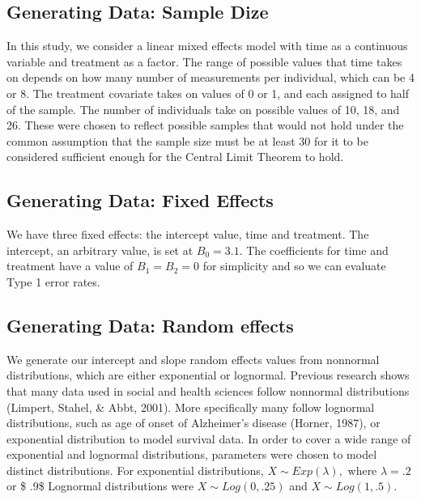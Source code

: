 \documentclass[12pt, twoside]{amherstthesis}
\begin{document}
\hypertarget{generating-data-sample-dize}{%
\subsection{Generating Data: Sample Dize}\label{generating-data-sample-dize}}

In this study, we consider a linear mixed effects model with time as a continuous variable and treatment as a factor. The range of possible values that time takes on depends on how many number of measurements per individual, which can be 4 or 8. The treatment covariate takes on values of 0 or 1, and each assigned to half of the sample. The number of individuals take on possible values of 10, 18, and 26. These were chosen to reflect possible samples that would not hold under the common assumption that the sample size must be at least 30 for it to be considered sufficient enough for the Central Limit Theorem to hold.

\hypertarget{generating-data-fixed-effects}{%
\subsection{Generating Data: Fixed Effects}\label{generating-data-fixed-effects}}

We have three fixed effects: the intercept value, time and treatment. The intercept, an arbitrary value, is set at \(B_0 = 3.1\). The coefficients for time and treatment have a value of \(B_1 = B_2 = 0\) for simplicity and so we can evaluate Type 1 error rates.

\hypertarget{generating-data-random-effects}{%
\subsection{Generating Data: Random effects}\label{generating-data-random-effects}}

We generate our intercept and slope random effects values from nonnormal distributions, which are either exponential or lognormal. Previous research shows that many data used in social and health sciences follow nonnormal distributions (Limpert, Stahel, \& Abbt, 2001). More specifically many follow lognormal distributions, such as age of onset of Alzheimer's disease (Horner, 1987), or exponential distribution to model survival data. In order to cover a wide range of exponential and lognormal distributions, parameters were chosen to model distinct distributions. For exponential distributions, \(X\sim\mathit{Exp}(\lambda),\) where \(\lambda = .2\) or \$ .9\$ Lognormal distributions were \(X\sim\mathit{Log}(0,.25)\) and \(X\sim\mathit{Log}(1,.5).\)
\end{document}
